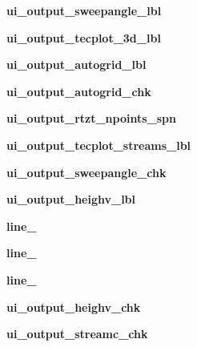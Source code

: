 \begin{DoxyCompactItemize}
\item 
\hypertarget{a00075_ac1c6cd8619b834a5b653a36f784fb43e}{}\label{a00075_ac1c6cd8619b834a5b653a36f784fb43e} 
{\bfseries ui\+\_\+output\+\_\+sweepangle\+\_\+lbl}
\item 
\hypertarget{a00075_aacdb4037b930e2ee45ab5c333990a969}{}\label{a00075_aacdb4037b930e2ee45ab5c333990a969} 
{\bfseries ui\+\_\+output\+\_\+tecplot\+\_\+3d\+\_\+lbl}
\item 
\hypertarget{a00075_aa8b180aa3d27924eb0fe24e40d2bb03e}{}\label{a00075_aa8b180aa3d27924eb0fe24e40d2bb03e} 
{\bfseries ui\+\_\+output\+\_\+autogrid\+\_\+lbl}
\item 
\hypertarget{a00075_ad31bb569d28370ccbd2b76bb7a4b8b89}{}\label{a00075_ad31bb569d28370ccbd2b76bb7a4b8b89} 
{\bfseries ui\+\_\+output\+\_\+autogrid\+\_\+chk}
\item 
\hypertarget{a00075_a726af21c576e9cfa777b00fa72b6eadf}{}\label{a00075_a726af21c576e9cfa777b00fa72b6eadf} 
{\bfseries ui\+\_\+output\+\_\+rtzt\+\_\+npoints\+\_\+spn}
\item 
\hypertarget{a00075_ad6ef09a5ac4e379fd644cd77d0db11ca}{}\label{a00075_ad6ef09a5ac4e379fd644cd77d0db11ca} 
{\bfseries ui\+\_\+output\+\_\+tecplot\+\_\+streams\+\_\+lbl}
\item 
\hypertarget{a00075_af13e62fd96ef8e9fd80f03ca365f9117}{}\label{a00075_af13e62fd96ef8e9fd80f03ca365f9117} 
{\bfseries ui\+\_\+output\+\_\+sweepangle\+\_\+chk}
\item 
\hypertarget{a00075_a8b6a216e0c5079501ecb0faf10f28a9b}{}\label{a00075_a8b6a216e0c5079501ecb0faf10f28a9b} 
{\bfseries ui\+\_\+output\+\_\+heighv\+\_\+lbl}
\item 
\hypertarget{a00075_a7164809ee0f9eaf1fc8ef281866630e6}{}\label{a00075_a7164809ee0f9eaf1fc8ef281866630e6} 
{\bfseries line\+\_}
\item 
\hypertarget{a00075_af03231f676dd6187432bb4007a3056dd}{}\label{a00075_af03231f676dd6187432bb4007a3056dd} 
{\bfseries line\+\_}
\item 
\hypertarget{a00075_ad08c484a4323a6f6051cf71cfa1a208e}{}\label{a00075_ad08c484a4323a6f6051cf71cfa1a208e} 
{\bfseries line\+\_}
\item 
\hypertarget{a00075_a72d1aa573f44078c64d2e5c063ef15ba}{}\label{a00075_a72d1aa573f44078c64d2e5c063ef15ba} 
{\bfseries ui\+\_\+output\+\_\+heighv\+\_\+chk}
\item 
\hypertarget{a00075_a3a0f0c6441ea06c8a04d5dc13cb2dc8e}{}\label{a00075_a3a0f0c6441ea06c8a04d5dc13cb2dc8e} 
{\bfseries ui\+\_\+output\+\_\+streamc\+\_\+chk}
\item 

\end{DoxyCompactItemize}
